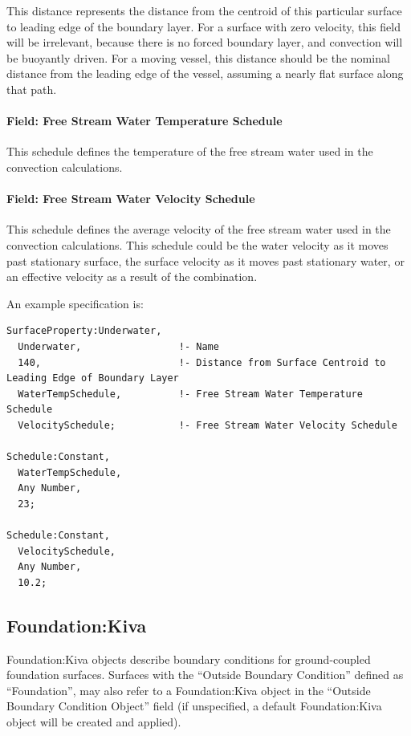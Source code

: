 This distance represents the distance from the centroid of this particular surface to leading edge of the boundary layer.
For a surface with zero velocity, this field will be irrelevant, because there is no forced boundary layer, and convection will be buoyantly driven.
For a moving vessel, this distance should be the nominal distance from the leading edge of the vessel, assuming a nearly flat surface along that path.

\paragraph{Field: Free Stream Water Temperature Schedule}\label{surfacepropertyunderwater-inputs-temperatureschedule}

This schedule defines the temperature of the free stream water used in the convection calculations.

\paragraph{Field: Free Stream Water Velocity Schedule}\label{surfacepropertyunderwater-inputs-velocityschedule}

This schedule defines the average velocity of the free stream water used in the convection calculations.
This schedule could be the water velocity as it moves past stationary surface, the surface velocity as it moves past stationary water, or an effective velocity as a result of the combination.

An example specification is:

\begin{lstlisting}
SurfaceProperty:Underwater,
  Underwater,                 !- Name
  140,                        !- Distance from Surface Centroid to Leading Edge of Boundary Layer
  WaterTempSchedule,          !- Free Stream Water Temperature Schedule
  VelocitySchedule;           !- Free Stream Water Velocity Schedule

Schedule:Constant,
  WaterTempSchedule,
  Any Number,
  23;

Schedule:Constant,
  VelocitySchedule,
  Any Number,
  10.2;
\end{lstlisting}

\subsection{Foundation:Kiva}\label{foundationkiva}

Foundation:Kiva objects describe boundary conditions for ground-coupled
foundation surfaces. Surfaces with the ``Outside Boundary Condition''
defined as ``Foundation'', may also refer to a Foundation:Kiva object in
the ``Outside Boundary Condition Object'' field (if unspecified, a
default Foundation:Kiva object will be created and applied).

